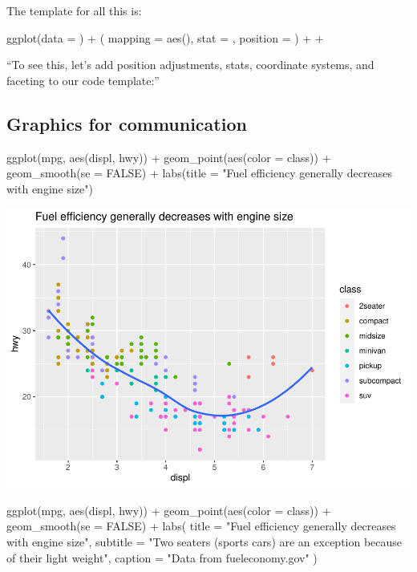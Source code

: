 \documentclass[
]{article}
\newenvironment{Shaded}{\begin{snugshade}}{\end{snugshade}}
\newcommand{\AttributeTok}[1]{\textcolor[rgb]{0.77,0.63,0.00}{#1}}
\newcommand{\ConstantTok}[1]{\textcolor[rgb]{0.00,0.00,0.00}{#1}}
\newcommand{\FunctionTok}[1]{\textcolor[rgb]{0.00,0.00,0.00}{#1}}
\newcommand{\NormalTok}[1]{#1}
\newcommand{\SpecialCharTok}[1]{\textcolor[rgb]{0.00,0.00,0.00}{#1}}
\newcommand{\StringTok}[1]{\textcolor[rgb]{0.31,0.60,0.02}{#1}}
\begin{document}
The template for all this is:

ggplot(data = ) + ( mapping = aes(), stat = , position = ) + +

``To see this, let's add position adjustments, stats, coordinate
systems, and faceting to our code template:''

\hypertarget{graphics-for-communication}{%
\subsection{Graphics for
communication}\label{graphics-for-communication}}

\begin{Shaded}
\begin{Highlighting}[]
\FunctionTok{ggplot}\NormalTok{(mpg, }\FunctionTok{aes}\NormalTok{(displ, hwy)) }\SpecialCharTok{+}
  \FunctionTok{geom\_point}\NormalTok{(}\FunctionTok{aes}\NormalTok{(}\AttributeTok{color =}\NormalTok{ class)) }\SpecialCharTok{+}
  \FunctionTok{geom\_smooth}\NormalTok{(}\AttributeTok{se =} \ConstantTok{FALSE}\NormalTok{) }\SpecialCharTok{+}
  \FunctionTok{labs}\NormalTok{(}\AttributeTok{title =} \StringTok{"Fuel efficiency generally decreases with engine size"}\NormalTok{)}
\end{Highlighting}
\end{Shaded}

\includegraphics{Journal_files/figure-latex/unnamed-chunk-51-1.pdf}

\begin{Shaded}
\begin{Highlighting}[]
\FunctionTok{ggplot}\NormalTok{(mpg, }\FunctionTok{aes}\NormalTok{(displ, hwy)) }\SpecialCharTok{+}
  \FunctionTok{geom\_point}\NormalTok{(}\FunctionTok{aes}\NormalTok{(}\AttributeTok{color =}\NormalTok{ class)) }\SpecialCharTok{+}
  \FunctionTok{geom\_smooth}\NormalTok{(}\AttributeTok{se =} \ConstantTok{FALSE}\NormalTok{) }\SpecialCharTok{+}
  \FunctionTok{labs}\NormalTok{(}
    \AttributeTok{title =} \StringTok{"Fuel efficiency generally decreases with engine size"}\NormalTok{,}
    \AttributeTok{subtitle =} \StringTok{"Two seaters (sports cars) are an exception because of their light weight"}\NormalTok{,}
    \AttributeTok{caption =} \StringTok{"Data from fueleconomy.gov"}
\NormalTok{  )}
\end{Highlighting}
\end{Shaded}
\end{document}
